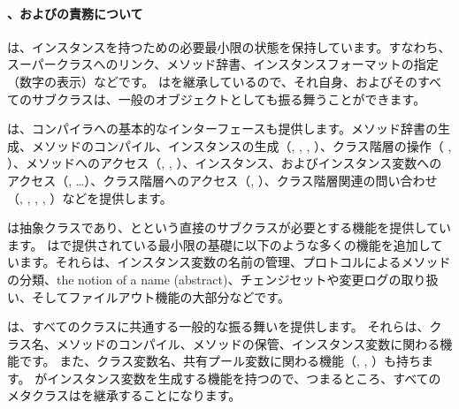 \documentclass[a4paper,10pt,twoside]{book}
\begin{document}

\paragraph{、およびの責務について}
は、インスタンスを持つための必要最小限の状態を保持しています。すなわち、スーパークラスへのリンク、メソッド辞書、インスタンスフォーマットの指定（\ie 数字の表示）などです。
はを継承しているので、それ自身、およびそのすべてのサブクラスは、一般のオブジェクトとしても振る舞うことができます。

は、コンパイラへの基本的なインターフェースも提供します。メソッド辞書の生成、メソッドのコンパイル、インスタンスの生成（\ie {}, , , ）、クラス階層の操作（\ie {} , ）、メソッドへのアクセス（\ie {}, , ）、インスタンス、およびインスタンス変数へのアクセス（\ie {}, \ldots）、クラス階層へのアクセス（\ie {}, ）、クラス階層関連の問い合わせ（\ie {}, , , , ）などを提供します。

は抽象クラスであり、とという直接のサブクラスが必要とする機能を提供しています。
はで提供されている最小限の基礎に以下のような多くの機能を追加しています。それらは、インスタンス変数の名前の管理、プロトコルによるメソッドの分類、the notion of a name (abstract)、チェンジセットや変更ログの取り扱い、そしてファイルアウト機能の大部分などです。

は、すべてのクラスに共通する一般的な振る舞いを提供します。
それらは、クラス名、メソッドのコンパイル、メソッドの保管、インスタンス変数に関わる機能です。
また、クラス変数名、共有プール変数に関わる機能（, , ）も持ちます。
がインスタンス変数を生成する機能を持つので、つまるところ、すべてのメタクラスはを継承することになります。
\end{document}
